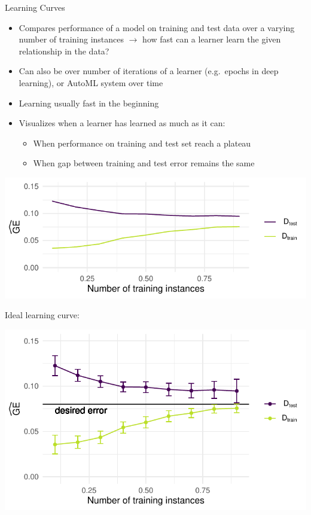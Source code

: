     \begin{frame}[c,allowframebreaks]{Learning Curves}

    \begin{itemize}
    \item Compares performance of a model on training and test data over a varying number of training instances $\rightarrow$ how fast can a learner learn the given relationship in the data?
    \item Can also be over number of iterations of a learner (e.g.\ epochs in
        deep learning), or AutoML system over time
    \item Learning usually fast in the beginning
    \item Visualizes when a learner has learned as much as it can:
    \begin{itemize}
    \item When performance on training and test set reach a plateau
    \item When gap between training and test error remains the same
    \end{itemize}
    \end{itemize}

    \begin{center}
    \includegraphics[height=.35\textheight]{learning-curve}
    \end{center}

    \framebreak

    Ideal learning curve:

    \begin{center}
    \includegraphics[height=.7\textheight]{learning-curve-ideal}
    \end{center}


\end{frame}
